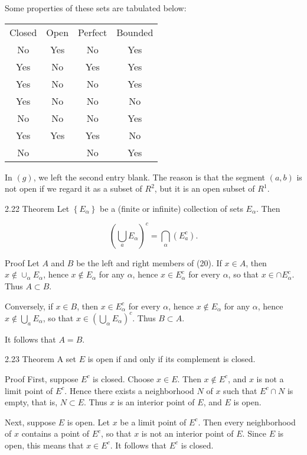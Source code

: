 \documentclass[10pt]{article}
\begin{document}
Some properties of these sets are tabulated below:

\begin{center}
\begin{tabular}{cccc}
Closed & Open & Perfect & Bounded \\
No & Yes & No & Yes \\
Yes & No & Yes & Yes \\
Yes & No & No & Yes \\
Yes & No & No & No \\
No & No & No & Yes \\
Yes & Yes & Yes & No \\
No &  & No & Yes \\
\end{tabular}
\end{center}

In $(g)$, we left the second entry blank. The reason is that the segment $(a, b)$ is not open if we regard it as a subset of $R^{2}$, but it is an open subset of $R^{1}$.

2.22 Theorem Let $\left\{E_{\alpha}\right\}$ be a (finite or infinite) collection of sets $E_{\alpha}$. Then

$$
\left(\bigcup_{a} E_{\alpha}\right)^{c}=\bigcap_{\alpha}\left(E_{a}^{c}\right) .
$$

Proof Let $A$ and $B$ be the left and right members of (20). If $x \in A$, then $x \notin \cup_{\alpha} E_{\alpha}$, hence $x \notin E_{\alpha}$ for any $\alpha$, hence $x \in E_{\alpha}^{c}$ for every $\alpha$, so that $x \in \cap E_{\alpha}^{c}$. Thus $A \subset B$.

Conversely, if $x \in B$, then $x \in E_{\alpha}^{c}$ for every $\alpha$, hence $x \notin E_{\alpha}$ for any $\alpha$, hence $x \notin \bigcup_{a} E_{\alpha}$, so that $x \in\left(\bigcup_{\alpha} E_{\alpha}\right)^{c}$. Thus $B \subset A$.

It follows that $A=B$.

2.23 Theorem A set $E$ is open if and only if its complement is closed.

Proof First, suppose $E^{c}$ is closed. Choose $x \in E$. Then $x \notin E^{c}$, and $x$ is not a limit point of $E^{c}$. Hence there exists a neighborhood $N$ of $x$ such that $E^{c} \cap N$ is empty, that is, $N \subset E$. Thus $x$ is an interior point of $E$, and $E$ is open.

Next, suppose $E$ is open. Let $x$ be a limit point of $E^{c}$. Then every neighborhood of $x$ contains a point of $E^{c}$, so that $x$ is not an interior point of $E$. Since $E$ is open, this means that $x \in E^{c}$. It follows that $E^{c}$ is closed.
\end{document}
